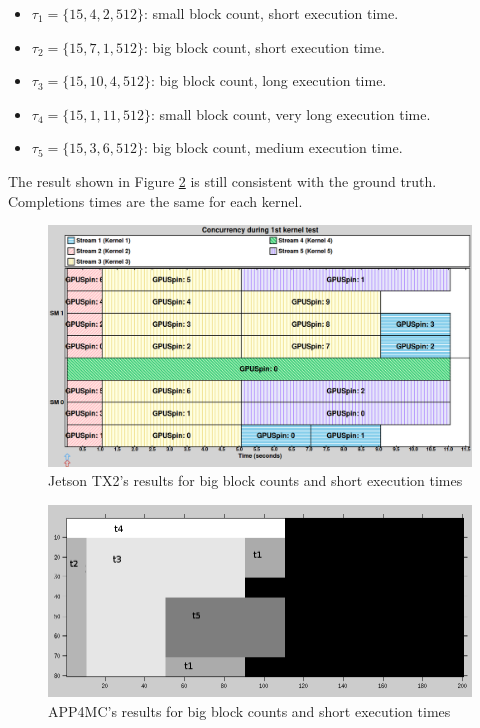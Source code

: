 \documentclass[
  12pt,
  a4paperpaper,
]{report}
\providecommand{\tightlist}{%
  \setlength{\itemsep}{0pt}\setlength{\parskip}{0pt}}
\begin{document}
\begin{itemize}
\tightlist
\item
  \(\tau_1 = \{15,4,2,512\}\): small block count, short execution time.
\item
  \(\tau_2 = \{15, 7,1,512\}\): big block count, short execution time.
\item
  \(\tau_3 = \{15,10,4,512\}\): big block count, long execution time.
\item
  \(\tau_4 =\{ 15, 1,11,512\}\): small block count, very long execution
  time.
\item
  \(\tau_5 = \{15,3,6,512\}\): big block count, medium execution time.
\end{itemize}

The result shown in Figure \ref{img:octave-ex06} is still consistent
with the ground truth. Completions times are the same for each kernel.

\begin{figure}
\centering
\includegraphics[width=1\textwidth,height=\textheight]{source/figures/nvidia/ex06.png}
\caption{Jetson TX2's results for big block counts and short execution times \label{img:nvidia-ex06}}
\end{figure}

\begin{figure}
\centering
\includegraphics[width=1\textwidth,height=\textheight]{source/figures/octave/ex06.png}
\caption{APP4MC's results for big block counts and short execution times \label{img:octave-ex06}}
\end{figure}
\end{document}
